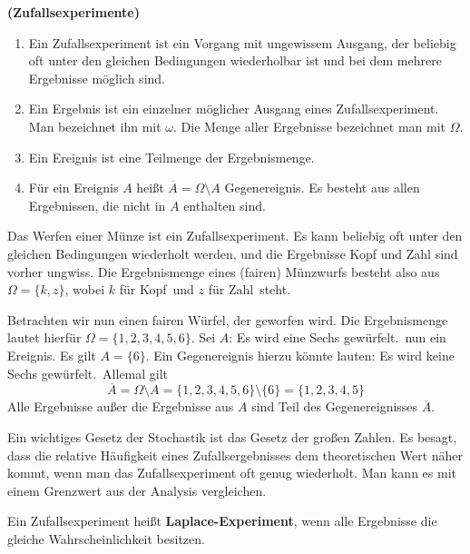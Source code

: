 \documentclass[ngerman, 12pt]{nssheetxea}
\begin{document}
\begin{definition} \textbf{(Zufallsexperimente)} \par
\begin{enumerate}
\item Ein Zufallsexperiment ist ein Vorgang mit ungewissem Ausgang, der beliebig oft unter den gleichen Bedingungen wiederholbar ist und bei dem mehrere Ergebnisse möglich sind.
\item Ein Ergebnis ist ein einzelner möglicher Ausgang eines Zufallsexperiment. Man bezeichnet ihn mit $\omega$. Die Menge aller Ergebnisse bezeichnet man mit $\Omega$.
\item Ein Ereignis ist eine Teilmenge der Ergebnismenge.
\item Für ein Ereignis $A$ heißt $\overline{A}=\Omega \setminus A$ Gegenereignis. Es besteht aus allen Ergebnissen, die nicht in $A$ enthalten sind.
\end{enumerate}
\label{Def:Zufallsexperiment}
\end{definition}

\begin{example}
Das Werfen einer Münze ist ein Zufallsexperiment. Es kann beliebig oft unter den gleichen Bedingungen wiederholt werden, und die Ergebnisse Kopf und Zahl sind vorher ungwiss. Die Ergebnismenge eines (fairen) Münzwurfs besteht also aus $\Omega=\{k,z\}$, wobei $k$ für \glqq Kopf\grqq \ und $z$ für \glqq Zahl\grqq \ steht. \par
Betrachten wir nun einen fairen Würfel, der geworfen wird. Die Ergebnismenge lautet hierfür $\Omega=\{1,2,3,4,5,6\}$. Sei $A$: \glqq Es wird eine Sechs gewürfelt.\grqq \ nun ein Ereignis. Es gilt $A=\{6\}$. Ein Gegenereignis hierzu könnte lauten: \glqq Es wird keine Sechs gewürfelt.\grqq  \ Allemal gilt
\[ \overline{A} = \Omega \setminus A = \{1,2,3,4,5,6\} \setminus \{6\} = \{1,2,3,4,5\}  \]
Alle Ergebnisse außer die Ergebnisse aus $A$ sind Teil des Gegenereignisses $\overline{A}$. 
\end{example}

Ein wichtiges Gesetz der Stochastik ist das Gesetz der großen Zahlen. Es besagt, dass die relative Häufigkeit eines Zufallsergebnisses dem theoretischen Wert näher kommt, wenn man das Zufallsexperiment oft genug wiederholt. Man kann es mit einem Grenzwert aus der Analysis vergleichen.

\begin{definition} Ein Zufallsexperiment heißt \textbf{Laplace-Experiment}, wenn alle Ergebnisse die gleiche Wahrscheinlichkeit besitzen. 
\end{definition}
\end{document}
